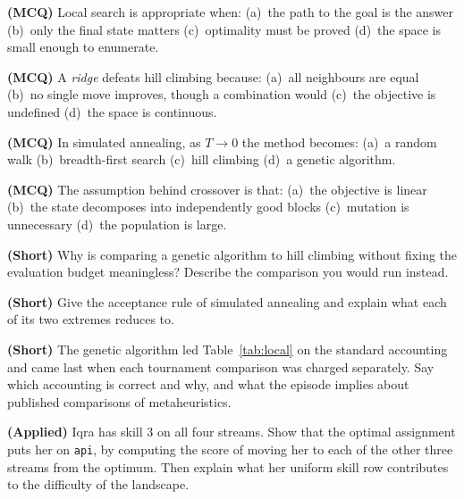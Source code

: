\begin{reviewq}
  \item \textbf{(MCQ)} Local search is appropriate when: (a)~the path to the goal is
        the answer (b)~only the final state matters (c)~optimality must be proved
        (d)~the space is small enough to enumerate.
  \item \textbf{(MCQ)} A \emph{ridge} defeats hill climbing because:
        (a)~all neighbours are equal (b)~no single move improves, though a
        combination would (c)~the objective is undefined (d)~the space is
        continuous.
  \item \textbf{(MCQ)} In simulated annealing, as $T \to 0$ the method becomes:
        (a)~a random walk (b)~breadth-first search (c)~hill climbing (d)~a genetic
        algorithm.
  \item \textbf{(MCQ)} The assumption behind crossover is that:
        (a)~the objective is linear (b)~the state decomposes into independently good
        blocks (c)~mutation is unnecessary (d)~the population is large.
  \item \textbf{(Short)} Why is comparing a genetic algorithm to hill climbing
        without fixing the evaluation budget meaningless? Describe the comparison
        you would run instead.
  \item \textbf{(Short)} Give the acceptance rule of simulated annealing and explain
        what each of its two extremes reduces to.
  \item \textbf{(Short)} The genetic algorithm led Table~\ref{tab:local} on the
        standard accounting and came last when each tournament comparison was charged
        separately. Say which accounting is correct and why, and what the episode
        implies about published comparisons of metaheuristics.
  \item \textbf{(Applied)} Iqra has skill $3$ on all four streams. Show that the
        optimal assignment puts her on \texttt{api}, by computing the score of
        moving her to each of the other three streams from the optimum. Then explain
        what her uniform skill row contributes to the difficulty of the landscape.
\end{reviewq}

